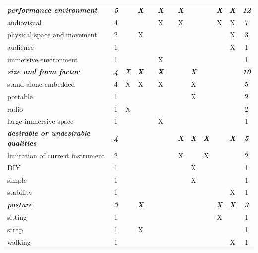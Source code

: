 \documentclass[letterpaper, 12pt]{article}
\begin{document}
\begin{spacing}{1.1}
\begin{supertabular}{L{5.3cm}cccccccccccc}
        \emph{\textbf{performance environment}} & \emph{\textbf{5}} & & \emph{\textbf{X}} & & \emph{\textbf{X}} & & \emph{\textbf{X}} & & & \emph{\textbf{X}} & \emph{\textbf{X}} & \emph{\textbf{12}} \\
        audiovisual                      & 4  &   &   &   & X &   & X &   &   & X & X & 7  \\
        physical space and movement     & 2  &   & X &   &   &   &   &   &   &   & X & 3  \\
        audience                         & 1  &   &   &   &   &   &   &   &   &   & X & 1  \\
        immersive environment            & 1  &   &   &   & X &   &   &   &   &   &   & 1  \\
        \hline
    
        \emph{\textbf{size and form factor}} & \emph{\textbf{4}} & \emph{\textbf{X}} & \emph{\textbf{X}} & & \emph{\textbf{X}} & & & \emph{\textbf{X}} & & & & \emph{\textbf{10}} \\
        stand-alone embedded             & 4  & X & X &   & X &   &   & X &   &   &   & 5  \\
        portable                         & 1  &   &   &   &   &   &   & X &   &   &   & 2  \\
        radio                            & 1  & X &   &   &   &   &   &   &   &   &   & 2  \\
        large immersive space            & 1  &   &   &   & X &   &   &   &   &   &   & 1  \\
        \hline
    
        \emph{\textbf{desirable or undesirable qualities}} & \emph{\textbf{4}} & & & & & & \emph{\textbf{X}} & \emph{\textbf{X}} & \emph{\textbf{X}} & & \emph{\textbf{X}} & \emph{\textbf{5}} \\
        limitation of current instrument & 2  &   &   &   &   &   & X &   & X &   &   & 2  \\ 
        DIY                              & 1  &   &   &   &   &   &   & X &   &   &   & 1  \\
        simple                           & 1  &   &   &   &   &   &   & X &   &   &   & 1  \\
        stability                        & 1  &   &   &   &   &   &   &   &   &   & X & 1  \\
        \hline
    
        \emph{\textbf{posture}} & \emph{\textbf{3}} & & \emph{\textbf{X}} & & & & & & & \emph{\textbf{X}} & \emph{\textbf{X}} & \emph{\textbf{3}} \\
        sitting                          & 1  &   &   &   &   &   &   &   &   & X &   & 1  \\
        strap                            & 1  &   & X &   &   &   &   &   &   &   &   & 1  \\
        walking                          & 1  &   &   &   &   &   &   &   &   &   & X & 1  \\
        \hline
    

\end{supertabular}
\end{spacing}
\end{document}
